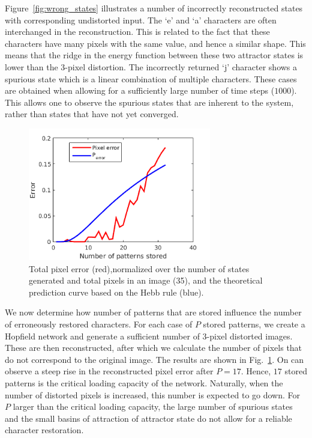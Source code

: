 \documentclass[pdftex,11pt,a4paper]{article}
\begin{document}
Figure~\ref{fig:wrong_states} illustrates a number of incorrectly reconstructed states with corresponding undistorted input. The `e' and `a' characters are often interchanged in the reconstruction. This is related to the fact that these characters have many pixels with the same value, and hence a similar shape. This means that the ridge in the energy function between these two attractor states is lower than the 3-pixel distortion. 
The incorrectly returned `j' character shows a spurious state which is a linear combination of multiple characters.
These cases are obtained when allowing for a sufficiently large number of time steps ($1000$). This allows one to observe the spurious states that are inherent to the system, rather than states that have not yet converged.

\begin{figure}[htb]
\centering
\includegraphics[width=8cm]{figs/Error_ifo_P.png}
\caption{Total pixel error (red),normalized over the number of states generated and total pixels in an image (35), and the theoretical prediction curve based on the Hebb rule (blue).\label{fig:error_ifo_P}}
\end{figure}

We now determine how number of patterns that are stored influence the number of erroneously restored characters. For each case of $P$ stored patterns, we create a Hopfield network and generate a sufficient number of 3-pixel distorted images. These are then reconstructed, after which we calculate the number of pixels that do not correspond to the original image. The results are shown in Fig.~\ref{fig:error_ifo_P}. On can observe a steep rise in the reconstructed pixel error after $P=17$. Hence, $17$ stored patterns is the critical loading capacity of the network. Naturally, when the number of distorted pixels is increased, this number is expected to go down. For $P$ larger than the critical loading capacity, the large number of spurious states and the small basins of attraction of attractor state do not allow for a reliable character restoration.
\end{document}
